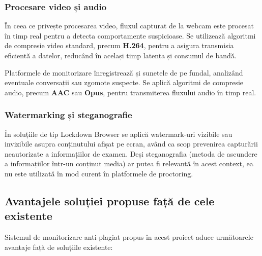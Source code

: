 \documentclass[12pt,a4paper]{article}
\begin{document}
\subsubsection{Procesare video și audio}
\hspace{6mm}În ceea ce privește procesarea video, fluxul capturat de la webcam este procesat în
timp real pentru a detecta comportamente suspicioase. Se utilizează algoritmi de
compresie video standard, precum \textbf{H.264}, pentru a asigura transmisia
eficientă a datelor, reducând în același timp latența și consumul de
bandă. 

Platformele de monitorizare înregistrează și sunetele de pe fundal, analizând 
eventuale conversații sau zgomote suspecte. Se aplică algoritmi de compresie audio, 
precum \textbf{AAC} sau \textbf{Opus}, pentru transmiterea fluxului audio în timp real.

\subsubsection{Watermarking și steganografie}
\hspace{6mm}În soluțiile de tip Lockdown Browser se aplică watermark-uri vizibile sau invizibile 
asupra conținutului afișat pe ecran, având ca scop prevenirea capturării neautorizate 
a informațiilor de examen. Deși steganografia (metoda de ascundere a informațiilor 
într-un conținut media) ar putea fi relevantă în acest context, ea nu este utilizată 
în mod curent în platformele de proctoring.

\subsection{Avantajele soluției propuse față de cele existente}

\hspace{6mm}Sistemul de monitorizare anti-plagiat propus în acest proiect aduce următoarele avantaje față de soluțiile existente:
\end{document}
